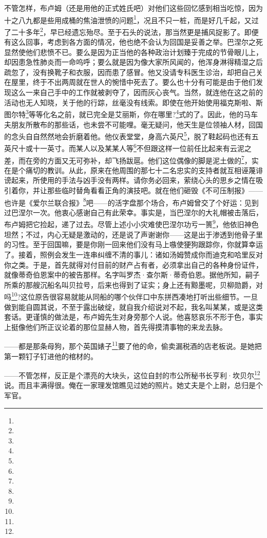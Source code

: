 \par 不管怎样，布卢姆（还是用他的正式姓氏吧）对他们这些回忆感到相当吃惊，因为十之八九都是些用成桶的焦油泄愤的问题\footnote{}，况且不只一桩，而是好几千起，又过了二十多年\footnote{}，早已经遗忘殆尽。至于石头的说法，那当然更是捕风捉影了。即便有这么回事，考虑到各方面的情况，他也绝不会认为回国是妥善之举。巴涅尔之死显然使他们悲愤不已。要么是因为正当他的各种政治计划臻于完成的节骨眼儿上，却因患急性肺炎而一命呜呼；要么就是因为像大家所风闻的，他浑身淋得精湿之后疏忽了，没有换靴子和衣服，因而患了感冒。他又没请专科医生诊治，却把自己关在屋里，终于不出两周就在世人的惋惜中死去了。要么也十分有可能是由于他们发现这么一来自己手中的工作就被剥夺了，因而灰心丧气。当然，就连他在这之前的活动也无人知晓，关于他的行踪，丝毫没有线索。即使在他开始使用福克斯啦、斯图尔特\footnote{}等等化名之前，就已完全是艾丽斯，你在哪里?\footnote{}式的了。因此，他的马车夫朋友所散布的那些话，也未尝不可能哩。毫无疑问，他天生是位领袖人材，回国的念头自自然然地会折磨着他。他仪表堂堂，身高六英尺\footnote{}，脱了鞋起码也还有五英尺十或十一英寸。而某人以及某某人等\footnote{}不但跟这样一位前任比起来有云泥之差，而在旁的方面又无可弥补，却飞扬跋扈。他们这位偶像的脚是泥土做的\footnote{}，实在是个痛切的教训。从此，原来在他周围的那七十二名忠实的支持者就互相诬蔑诽谤起来，所使用的手法与凶手没有两样。请你务必回来，萦绕心头的思乡之情在吸引着你，并让那些临时替角看看正角的演技吧。就在他们砸毁《不可压制报》——也许是《爱尔兰联合报》\footnote{}吧——的活字盘那个场合，布卢姆曾交了个好运：见到过巴涅尔一次。他衷心感谢自己有此荣幸。事实是，当巴涅尔的大礼帽被击落后，布卢姆把它捡起，递了过去。尽管上述小小灾难使巴涅尔功亏一篑\footnote{}，他依旧神色坦然；不过，内心无疑是激动的，还是说了声谢谢你——这是出于渗透到他骨子里的习性。至于回国嘛，要是你刚一回来他们没有马上嗾使㹴狗跟踪你，你就算幸运了。接着，照例会发生一连串纠缠不清的事儿：诸如汤姆赞成你而迪克和哈里反对你之类。于是，首先就得对付目前的财产占有者，必须拿出自己的各种身份证件，就像蒂奇伯恩案中的被告那样。名字叫罗杰·查尔斯·蒂奇伯恩。据他所知，嗣子所乘的那艘沉船名叫贝拉号，后来也得到了证实；身上还有黥墨呢，贝柳勋爵，对吗\footnote{}?这位原告很容易就能从同船的哪个伙伴口中东拼西凑地打听出些细节。一旦做到能自圆其说，不至于露出破绽，就自我介绍说对不起，我名叫某某，或是这类套话。更谨慎的做法是，布卢姆先生对身旁那个人说。他喜怒哀乐不形于色，事实上挺像他们所正议论着的那位显赫人物，首先得摸清事物的来龙去脉。
\par ——都是那条母狗，那个英国婊子\footnote{}要了他的命，偷卖漏税酒的店老板说。是她把第一颗钉子钉进他的棺材的。
\par ——不管怎样，反正是个漂亮的大块头，这位自封的市公所秘书长亨利·坎贝尔\footnote{}说。而且丰满得很。俺在一家理发馆瞧见过她的照片。她丈夫是个上尉，总归是个军官。
